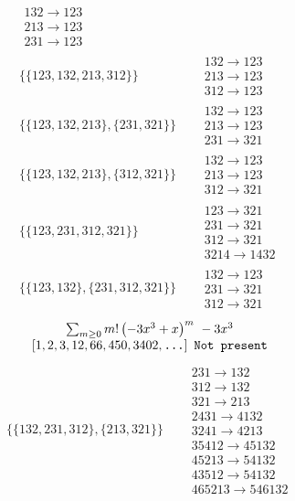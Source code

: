 \begin{tiny}
\begin{align}
\begin{matrix}
132 \to 123\\213 \to 123\\231 \to 123
\end{matrix}
\\
\{\{123, 132, 213, 312\}\}
\quad
&
\begin{matrix}
132 \to 123\\213 \to 123\\312 \to 123
\end{matrix}
\\
\{\{123, 132, 213\}, \{231, 321\}\}
\quad
&
\begin{matrix}
132 \to 123\\213 \to 123\\231 \to 321
\end{matrix}
\\
\{\{123, 132, 213\}, \{312, 321\}\}
\quad
&
\begin{matrix}
132 \to 123\\213 \to 123\\312 \to 321
\end{matrix}
\\
\{\{123, 231, 312, 321\}\}
\quad
&
\begin{matrix}
123 \to 321\\231 \to 321\\312 \to 321\\3214 \to 1432
\end{matrix}
\\
\{\{123, 132\}, \{231, 312, 321\}\}
\quad
&
\begin{matrix}
132 \to 123\\231 \to 321\\312 \to 321
\end{matrix}
\end{align}
$$
\begin{matrix}
\sum_{m \geq 0} m! \left(
-3 x^{3} + x
\right)^m
\ 
-3 x^{3}
\\
\left[1, 2, 3, 12, 66, 450, 3402, \text{\texttt{...}}\right]
\ 
\texttt{Not present}
\end{matrix}
$$
\vspace{-1em}
\begin{align}
\{\{132, 231, 312\}, \{213, 321\}\}
\quad
&
\begin{matrix}
231 \to 132\\312 \to 132\\321 \to 213\\2431 \to 4132\\3241 \to 4213\\35412 \to 45132\\45213 \to 54132\\43512 \to 54132\\465213 \to 546132

\end{matrix}
\end{align}
\end{tiny}

